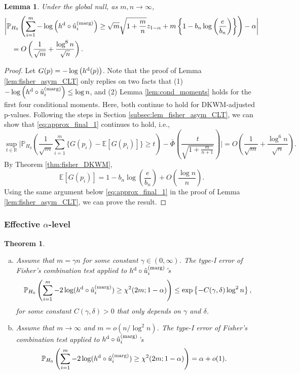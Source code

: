 \documentclass[11pt]{article}
\newtheorem{thm}{Theorem}
\newtheorem{lemma}{Lemma}
\def\R{\mathbb{R}}
\def\E{\mathbb{E}}
\def\marg{\textnormal{(marg)}}
\def\dkwm{\textnormal{d}}
\renewcommand{\P}{\mathbb{P}}
\newcommand{\lb}{\left(}
\newcommand{\rb}{\right)}
\begin{document}
\begin{lemma}\label{lem:fisher_dkwm_CLT}
  Under the global null, as $m, n\rightarrow \infty$,
  \begin{align*}
    &\bigg|\P_{H_0}\lb \sum_{i=1}^{m}-\log\lb h^{\dkwm}\circ \hat{u}^\marg_i\rb\ge \sqrt{m}\sqrt{1 + \frac{m}{n}}z_{1- \alpha} + m \left\{ 1 - b_n\log\lb\frac{e}{b_n}\rb\right\}\rb - \alpha\bigg|\\
    & \quad = O\lb \frac{1}{\sqrt{m}} + \frac{\log^6 n}{\sqrt{n}}\rb.    
  \end{align*}
\end{lemma}
\begin{proof}
  Let $G(p) = -\log\lb h^{\dkwm}(p)\rb$. Note that the proof of Lemma \ref{lem:fisher_asym_CLT} only replies on two facts that (1) $-\log\lb h^{\dkwm}\circ \hat{u}^\marg_i\rb\le \log n$, and (2) Lemma \ref{lem:cond_moments} holds for the first four conditional moments. Here, both continue to hold for DKWM-adjusted p-values. Following the steps in Section \ref{subsec:lem_fisher_asym_CLT}, we can show that \eqref{eq:approx_final_1} continues to hold, i.e.,
  \begin{equation}\label{eq:approx_dkwm}
  \sup_{t\in \R}\bigg|\P_{H_0}\lb \frac{1}{\sqrt{m}}\sum_{i=1}^{m}\{G(p_i) - \E[G(p_i)]\} \ge t \rb - \bar{\Phi}\lb \frac{t}{\sqrt{1 + \frac{m}{n+1}}}\rb\bigg| = O\lb \frac{1}{\sqrt{m}} + \frac{\log^6 n}{\sqrt{n}}\rb.
\end{equation}
By Theorem \ref{thm:fisher_DKWM},
\[\E[G(p_i)] = 1 - b_n\log\lb\frac{e}{b_n}\rb + O\lb\frac{\log n}{n}\rb.\]
Using the same argument below \eqref{eq:approx_final_1} in the proof of Lemma \ref{lem:fisher_asym_CLT}, we can prove the result.
\end{proof}

\subsubsection{Effective $\alpha$-level}
\begin{thm}\label{thm:fisher_dkwm_effective_alpha}
  \begin{enumerate}[(a)]
  \item  Assume that $m = \gamma n$ for some constant $\gamma \in (0, \infty)$. The type-I error of Fisher's combination test applied to $h^\dkwm\circ \hat{u}_i^\marg$'s
    \[\P_{H_0}\lb\sum_{i=1}^{m} -2\log(h^\dkwm \circ \hat{u}_i^\marg)\ge \chi^2(2m; 1 - \alpha)\rb \le \exp\left\{-C(\gamma, \delta)\log^2 n\right\},\]
    for some constant $C(\gamma, \delta) > 0$ that only depends on $\gamma$ and $\delta$. 
  \item Assume that $m \rightarrow \infty$ and $m = o(n / \log^2 n)$. The type-I error of Fisher's combination test applied to $h^\dkwm\circ \hat{u}_i^\marg$'s
  \begin{align*}
    &\P_{H_0}\lb\sum_{i=1}^{m} -2\log(h^\dkwm \circ \hat{u}_i^\marg)\ge \chi^2(2m; 1 - \alpha)\rb = \alpha + o(1).
  \end{align*}
  \end{enumerate}
\end{thm}
\end{document}
